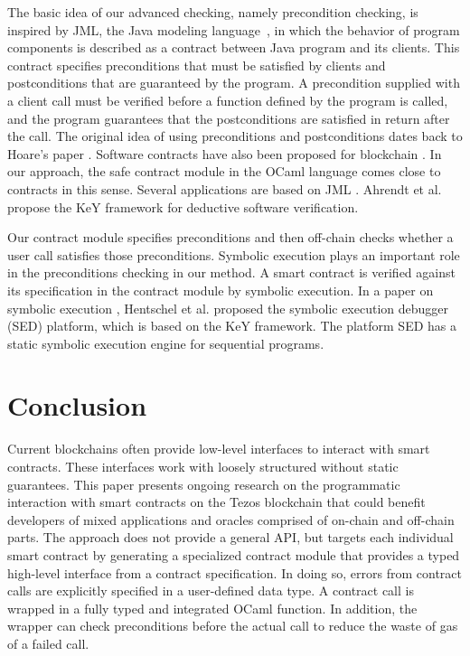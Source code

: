 \documentclass[a4paper,USenglish,american,cleveref, autoref, thm-restate]{oasics-v2021}
\begin{document}
The basic idea of our advanced checking, namely precondition checking,
is inspired by JML, the Java modeling
language~\cite{Leavens2006DesignBC, 101007}, in which the behavior of 
program components is described as a contract between Java
program and its clients. This contract specifies
preconditions that must be satisfied by clients and postconditions
that are guaranteed by the program. A precondition supplied with a
client call must be verified before a function defined by the program
is called, and the program guarantees that the postconditions are
satisfied in return after the call. The original idea of using
preconditions and postconditions dates back to Hoare's paper
\cite{101145}. Software contracts have also been proposed for
blockchain \cite{DBLP:journals/fbloc/Bartoletti20}.
In our approach, the safe contract module in the OCaml language comes
close to contracts in this sense. Several
applications are based on JML \cite{Tran2017}. Ahrendt et
al. \cite{keY} propose the KeY framework for deductive software
verification.  

Our contract module specifies preconditions and then off-chain checks whether a user call satisfies those preconditions. Symbolic execution plays an important role in the preconditions checking in our method. A smart contract is verified against its specification in the contract module by symbolic execution. In a paper on symbolic execution \cite{Hentschel}, Hentschel et al. proposed the symbolic execution debugger (SED) platform, which is based on the KeY framework. The platform SED has a static symbolic execution engine for sequential programs.

\section{Conclusion}
\label{sec:conclusion}

Current blockchains often provide low-level interfaces to interact
with smart contracts. These interfaces work with loosely structured
without static guarantees. This paper presents ongoing research on the
programmatic interaction with smart contracts on the Tezos blockchain
that could benefit developers of mixed applications and
oracles comprised of on-chain and off-chain parts. The approach does
not provide a general API, but targets each 
individual smart contract by generating a specialized contract module
that provides a typed high-level interface from a contract
specification. In doing so, errors from contract calls are explicitly
specified in a user-defined data type. A contract call is wrapped in a
fully typed and integrated OCaml function. In addition, the wrapper can check preconditions before the 
actual call to reduce the waste of gas of a failed call.
\end{document}
